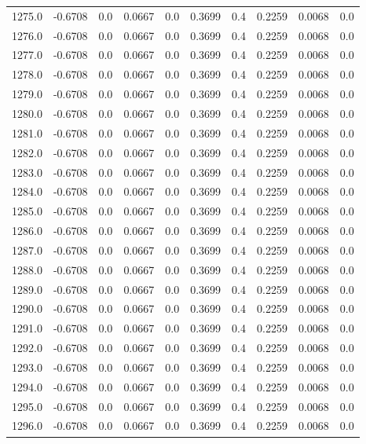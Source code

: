 \begin{longtable}{lrrrrrrrrr}
1275.0 & -0.6708 & 0.0 & 0.0667 & 0.0 & 0.3699 & 0.4 & 0.2259 & 0.0068 & 0.0 \\
1276.0 & -0.6708 & 0.0 & 0.0667 & 0.0 & 0.3699 & 0.4 & 0.2259 & 0.0068 & 0.0 \\
1277.0 & -0.6708 & 0.0 & 0.0667 & 0.0 & 0.3699 & 0.4 & 0.2259 & 0.0068 & 0.0 \\
1278.0 & -0.6708 & 0.0 & 0.0667 & 0.0 & 0.3699 & 0.4 & 0.2259 & 0.0068 & 0.0 \\
1279.0 & -0.6708 & 0.0 & 0.0667 & 0.0 & 0.3699 & 0.4 & 0.2259 & 0.0068 & 0.0 \\
1280.0 & -0.6708 & 0.0 & 0.0667 & 0.0 & 0.3699 & 0.4 & 0.2259 & 0.0068 & 0.0 \\
1281.0 & -0.6708 & 0.0 & 0.0667 & 0.0 & 0.3699 & 0.4 & 0.2259 & 0.0068 & 0.0 \\
1282.0 & -0.6708 & 0.0 & 0.0667 & 0.0 & 0.3699 & 0.4 & 0.2259 & 0.0068 & 0.0 \\
1283.0 & -0.6708 & 0.0 & 0.0667 & 0.0 & 0.3699 & 0.4 & 0.2259 & 0.0068 & 0.0 \\
1284.0 & -0.6708 & 0.0 & 0.0667 & 0.0 & 0.3699 & 0.4 & 0.2259 & 0.0068 & 0.0 \\
1285.0 & -0.6708 & 0.0 & 0.0667 & 0.0 & 0.3699 & 0.4 & 0.2259 & 0.0068 & 0.0 \\
1286.0 & -0.6708 & 0.0 & 0.0667 & 0.0 & 0.3699 & 0.4 & 0.2259 & 0.0068 & 0.0 \\
1287.0 & -0.6708 & 0.0 & 0.0667 & 0.0 & 0.3699 & 0.4 & 0.2259 & 0.0068 & 0.0 \\
1288.0 & -0.6708 & 0.0 & 0.0667 & 0.0 & 0.3699 & 0.4 & 0.2259 & 0.0068 & 0.0 \\
1289.0 & -0.6708 & 0.0 & 0.0667 & 0.0 & 0.3699 & 0.4 & 0.2259 & 0.0068 & 0.0 \\
1290.0 & -0.6708 & 0.0 & 0.0667 & 0.0 & 0.3699 & 0.4 & 0.2259 & 0.0068 & 0.0 \\
1291.0 & -0.6708 & 0.0 & 0.0667 & 0.0 & 0.3699 & 0.4 & 0.2259 & 0.0068 & 0.0 \\
1292.0 & -0.6708 & 0.0 & 0.0667 & 0.0 & 0.3699 & 0.4 & 0.2259 & 0.0068 & 0.0 \\
1293.0 & -0.6708 & 0.0 & 0.0667 & 0.0 & 0.3699 & 0.4 & 0.2259 & 0.0068 & 0.0 \\
1294.0 & -0.6708 & 0.0 & 0.0667 & 0.0 & 0.3699 & 0.4 & 0.2259 & 0.0068 & 0.0 \\
1295.0 & -0.6708 & 0.0 & 0.0667 & 0.0 & 0.3699 & 0.4 & 0.2259 & 0.0068 & 0.0 \\
1296.0 & -0.6708 & 0.0 & 0.0667 & 0.0 & 0.3699 & 0.4 & 0.2259 & 0.0068 & 0.0 \\

\end{longtable}

